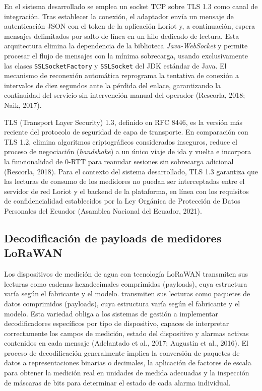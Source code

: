 \documentclass[12pt,a4paper,oneside]{report}
\begin{document}
En el sistema desarrollado se emplea un socket TCP sobre TLS 1.3 como canal de integración. Tras establecer la conexión, el adaptador envía un mensaje de autenticación JSON con el token de la aplicación Loriot y, a continuación, espera mensajes delimitados por salto de línea en un hilo dedicado de lectura. Esta arquitectura elimina la dependencia de la biblioteca \textit{Java-WebSocket} y permite procesar el flujo de mensajes con la mínima sobrecarga, usando exclusivamente las clases \texttt{SSLSocketFactory} y \texttt{SSLSocket} del JDK estándar de Java. El mecanismo de reconexión automática reprograma la tentativa de conexión a intervalos de diez segundos ante la pérdida del enlace, garantizando la continuidad del servicio sin intervención manual del operador (Rescorla, 2018; Naik, 2017).

TLS (Transport Layer Security) 1.3, definido en RFC 8446, es la versión más reciente del protocolo de seguridad de capa de transporte. En comparación con TLS 1.2, elimina algoritmos criptográficos considerados inseguros, reduce el proceso de negociación (\textit{handshake}) a un único viaje de ida y vuelta e incorpora la funcionalidad de 0-RTT para reanudar sesiones sin sobrecarga adicional (Rescorla, 2018). Para el contexto del sistema desarrollado, TLS 1.3 garantiza que las lecturas de consumo de los medidores no puedan ser interceptadas entre el servidor de red Loriot y el backend de la plataforma, en línea con los requisitos de confidencialidad establecidos por la Ley Orgánica de Protección de Datos Personales del Ecuador (Asamblea Nacional del Ecuador, 2021).

\subsection{Decodificación de payloads de medidores LoRaWAN}\label{decodificaciuxf3n-de-payloads-de-medidores-lorawan}

Los dispositivos de medición de agua con tecnología LoRaWAN transmiten sus lecturas como cadenas hexadecimales comprimidas (payloads), cuya estructura varía según el fabricante y el modelo. transmiten sus lecturas como paquetes de datos comprimidos (payloads), cuya estructura varía según el fabricante y el modelo. Esta variedad obliga a los sistemas de gestión a implementar decodificadores específicos por tipo de dispositivo, capaces de interpretar correctamente los campos de medición, estado del dispositivo y alarmas activas contenidos en cada mensaje (Adelantado et al., 2017; Augustin et al., 2016). El proceso de decodificación generalmente implica la conversión de paquetes de datos a representaciones binarias o decimales, la aplicación de factores de escala para obtener la medición real en unidades de medida adecuadas y la inspección de máscaras de bits para determinar el estado de cada alarma individual.
\end{document}
